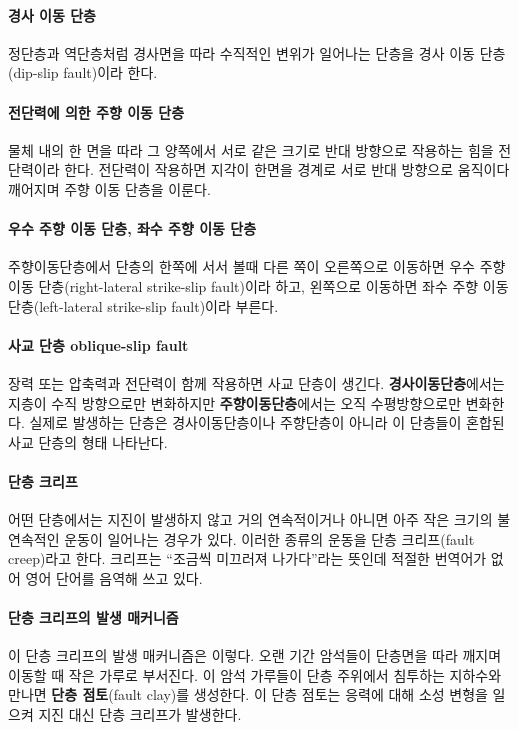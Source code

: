 \documentclass[12pt, a4paper, oneside]{book}
\begin{document}
		\paragraph{경사 이동 단층}
		정단층과 역단층처럼 경사면을 따라 수직적인 변위가 일어나는 단층을 경사 이동 단층(dip-slip fault)이라 한다.
		
		\paragraph{전단력에 의한 주향 이동 단층}
		물체 내의 한 면을 따라 그 양쪽에서 서로 같은 크기로 반대 방향으로 작용하는 힘을 전단력이라 한다. 
		전단력이 작용하면 지각이 한면을 경계로 서로 반대 방향으로 움직이다 깨어지며 주향 이동 단층을 이룬다.

		\paragraph{우수 주향 이동 단층, 좌수 주향 이동 단층}
		주향이동단층에서 단층의 한쪽에 서서 볼때 다른 쪽이 오른쪽으로 이동하면 우수 주향 이동 단층(right-lateral strike-slip fault)이라 하고, 왼쪽으로 이동하면 좌수 주향 이동 단층(left-lateral strike-slip fault)이라 부른다.
		
		\paragraph{사교 단층 oblique-slip fault}
		장력 또는 압축력과 전단력이 함께 작용하면 사교 단층이 생긴다.		
		\textbf{경사이동단층}에서는 지층이 수직 방향으로만 변화하지만 
		\textbf{주향이동단층}에서는 오직 수평방향으로만 변화한다.
		실제로 발생하는 단층은 경사이동단층이나 주향단층이 아니라 이 단층들이 혼합된 사교 단층의 형태 나타난다.
		
		
		
		\paragraph{단층 크리프}
		어떤 단층에서는 지진이 발생하지 않고 
		거의 연속적이거나 아니면 아주 작은 크기의 불연속적인 운동이 일어나는 경우가 있다. 
		이러한 종류의 운동을 단층 크리프(fault creep)라고 한다.
		크리프는 ``조금씩 미끄러져 나가다''라는 뜻인데 적절한 번역어가 없어 영어 단어를 음역해 쓰고 있다.

		\paragraph{단층 크리프의 발생 매커니즘}
		이 단층 크리프의 발생 매커니즘은 이렇다.
		오랜 기간 암석들이 단층면을 따라 깨지며 이동할 때 작은 가루로 부서진다.
		이 암석 가루들이 단층 주위에서 침투하는 지하수와 만나면 \textbf{단층 점토}(fault clay)를 생성한다.
		이 단층 점토는 응력에 대해 소성 변형을 일으켜 지진 대신 단층 크리프가 발생한다.\\
\end{document}
